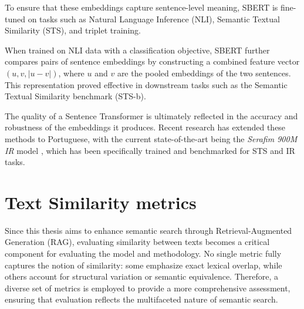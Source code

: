 To ensure that these embeddings capture sentence-level meaning, SBERT is fine-tuned on tasks such as Natural Language Inference (NLI), Semantic Textual Similarity (STS), and triplet training. 

When trained on NLI data with a classification objective, SBERT further compares pairs of sentence embeddings by constructing a combined feature vector $(u, v, |u-v|)$, where $u$ and $v$ are the pooled embeddings of the two sentences. This representation proved effective in downstream tasks such as the Semantic Textual Similarity benchmark (STS-b).

The quality of a Sentence Transformer is ultimately reflected in the accuracy and robustness of the embeddings it produces. Recent research has extended these methods to Portuguese, with the current state-of-the-art being the \textit{Serafim 900M IR} model \cite{gomes2024opensentenceembeddingsportuguese}, which has been specifically trained and benchmarked for \ac{STS} and \ac{IR} tasks.


\section{Text Similarity metrics}
Since this thesis aims to enhance semantic search through Retrieval-Augmented Generation (\ac{RAG}), 
evaluating similarity between texts becomes a critical component for evaluating the model and methodology. 
No single metric fully captures the notion of similarity: some emphasize exact lexical overlap, 
while others account for structural variation or semantic equivalence. 
Therefore, a diverse set of metrics is employed to provide a more comprehensive assessment, 
ensuring that evaluation reflects the multifaceted nature of semantic search.

